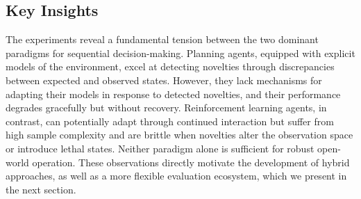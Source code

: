 \subsection{Key Insights}
\label{sec:ngw_insights}

The \NovelGridworlds{} experiments reveal a fundamental tension between the two dominant paradigms for sequential decision-making. Planning agents, equipped with explicit models of the environment, excel at detecting novelties through discrepancies between expected and observed states. However, they lack mechanisms for adapting their models in response to detected novelties, and their performance degrades gracefully but without recovery. Reinforcement learning agents, in contrast, can potentially adapt through continued interaction but suffer from high sample complexity and are brittle when novelties alter the observation space or introduce lethal states. Neither paradigm alone is sufficient for robust open-world operation. These observations directly motivate the development of hybrid approaches, as well as a more flexible evaluation ecosystem, which we present in the next section.
